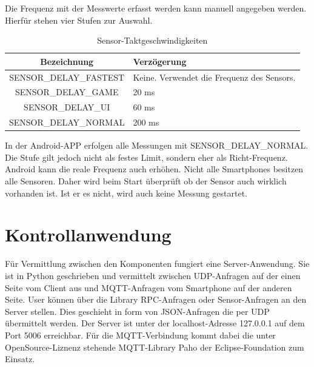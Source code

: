 \documentclass[11pt,a4paper]{report}
\begin{document}
Die Frequenz mit der Messwerte erfasst werden kann manuell angegeben werden.
Hierfür stehen vier Stufen zur Auswahl.
\begin{table}[htbp]
  \centering
  \begin{tabular}{|c|p{4cm}|}
      \hline
      \textbf{Bezeichnung} & \textbf{Verzögerung} \\
	  \hline
      SENSOR\_DELAY\_FASTEST & Keine. Verwendet die Frequenz des Sensors.\\
      \hline
      SENSOR\_DELAY\_GAME & 20 ms\\
      \hline
      SENSOR\_DELAY\_UI & 60 ms\\
      \hline
      SENSOR\_DELAY\_NORMAL & 200 ms\\
      \hline
  \end{tabular}
  \caption{Sensor-Taktgeschwindigkeiten\cite{sensor-takt}}
  \label{tab:sensor_speeds}
\end{table}
In der Android-APP erfolgen alle Messungen mit SENSOR\_DELAY\_NORMAL.
Die Stufe gilt jedoch nicht als festes Limit, sondern eher als Richt-Frequenz.
Android kann die reale Frequenz auch erhöhen.
Nicht alle Smartphones besitzen alle Sensoren.
Daher wird beim Start überprüft ob der Sensor auch wirklich vorhanden ist.
Ist er es nicht, wird auch keine Messung gestartet.


\chapter{Kontrollanwendung}\label{chap:server_software}

Für Vermittlung zwischen den Komponenten fungiert eine Server-Anwendung.
Sie ist in Python geschrieben und vermittelt zwischen UDP-Anfragen auf der einen Seite vom Client aus und MQTT-Anfragen vom Smartphone auf der anderen Seite.
User können über die Library RPC-Anfragen oder Sensor-Anfragen an den Server stellen.
Dies geschieht in form von JSON-Anfragen die per UDP übermittelt werden.
Der Server ist unter der localhost-Adresse 127.0.0.1 auf dem Port 5006 erreichbar.
Für die MQTT-Verbindung kommt dabei die unter OpenSource-Liznenz stehende MQTT-Library Paho der Eclipse-Foundation zum Einsatz. \cite{paho}
\end{document}
